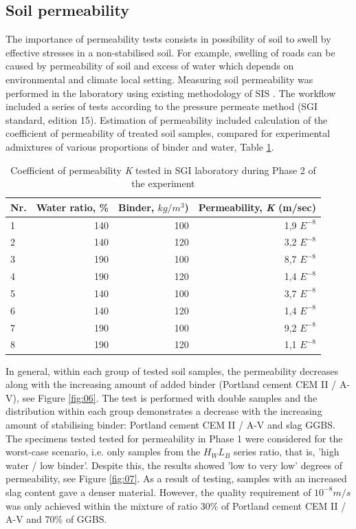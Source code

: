\documentclass{amestyle}
\begin{document}
\subsection{Soil permeability}
The importance of permeability tests consists in possibility of soil to swell by effective stresses in a non-stabilised soil. For example, swelling of roads can be caused by permeability of soil and excess of water which depends on environmental and climate local setting. Measuring soil permeability was performed in the laboratory using existing methodology of SIS \cite{SIS2019}. The workflow included a series of tests according to the pressure permeate method (SGI standard, edition 15). Estimation of permeability included calculation of the coefficient of permeability of treated soil samples, compared for experimental admixtures of various proportions of binder and water, Table \ref{tab:1}.

\begin{table}[htbp]
  \caption{Coefficient of permeability \emph{K} tested in SGI laboratory during Phase 2 of the experiment}
  \label{tab:1}
  \centering
  \begin{tabular}{| l | r | r | r |}
    \hline
    \multicolumn{1}{|c|}{Nr.} &
    \multicolumn{1}{|c|}{Water ratio, \%} &
    \multicolumn{1}{|c|}{Binder, $kg/m^3$)} &
    \multicolumn{1}{|c|}{Permeability, \emph{K} (m/sec) } \\\hline
    1 & 140 & 100 & 1,9 $E^{-8}$ \\
    2 & 140 & 120 & 3,2 $E^{-8}$ \\
    3 & 190 & 100 & 8,7 $E^{-8}$ \\
    4 & 190 & 120 & 1,4 $E^{-8}$ \\
    5 & 140 & 100 & 3,7 $E^{-8}$ \\
    6 & 140 & 120 & 1,4 $E^{-8}$ \\
    7 & 190 & 100 & 9,2 $E^{-8}$ \\
    8 & 190 & 120 & 1,1 $E^{-8}$ \\\hline
  \end{tabular}
\end{table}

In general, within each group of tested soil samples, the permeability decreases along with the increasing amount of added binder (Portland cement CEM II / A-V), see Figure \ref{fig:06}. The test is performed with double samples and the distribution within each group demonstrates a decrease with the increasing amount of stabilising binder: Portland cement CEM II / A-V and slag GGBS. The specimens tested tested for permeability in Phase 1 were considered for the worst-case scenario, i.e. only samples from the $H_WL_B$ series ratio, that is, 'high water / low binder'. Despite this, the results showed 'low to very low' degrees of permeability, see Figure \ref{fig:07}. As a result of testing, samples with an increased slag content gave a denser material. However, the quality requirement of $10^{-8} m/s$ was only achieved within the mixture of ratio 30\% of Portland cement CEM II / A-V and 70\% of GGBS. 
\end{document}
